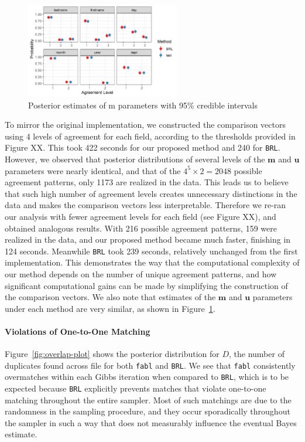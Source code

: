 \documentclass[12pt,letterpaper]{article}
\newcommand{\1}[1]{\mathbb{I}\!\left[#1\right]} %
\begin{document}
\begin{figure}[t]
	
	{\centering \includegraphics[width=0.6\textwidth]{../notes/figures/el_salvador/m_posterior_smallP} 
		
	}
	
	\caption{Posterior estimates of m parameters with 95\% credible intervals}\label{fig:m-and-u}
\end{figure}

To mirror the original implementation, we constructed the comparison
vectors using 4 levels of agreement for each field, according to the
thresholds provided in Figure XX. This took 422 seconds for our proposed
method and 240 for \texttt{BRL}. However, we observed that posterior
distributions of several levels of the \(\mathbf{m}\) and \(\mathbf{u}\)
parameters were nearly identical, and that of the
\(4^5 \times 2 = 2048\) possible agreement patterns, only 1173 are
realized in the data. This leads us to believe that such high number of
agreement levels creates unnecessary distinctions in the data and makes
the comparison vectors less interpretable. Therefore we re-ran our
analysis with fewer agreement levels for each field (see Figure XX), and
obtained analogous results. With 216 possible agreement patterns, 159
were realized in the data, and our proposed method became much faster,
finishing in 124 seconds. Meanwhile \texttt{BRL} took 239 seconds,
relatively unchanged from the first implementation. This demonstrates
the way that the computational complexity of our method depends on the
number of unique agreement patterns, and how significant computational
gains can be made by simplifying the construction of the comparison
vectors. We also note that estimates of the \(\mathbf{m}\) and
\(\mathbf{u}\) parameters under each method are very similar, as shown in
Figure~\ref{fig:m-and-u}.

\paragraph{Violations of One-to-One Matching} Figure~\ref{fig:overlap-plot} shows the posterior distribution for \(D\), the number of
duplicates found across file for both \texttt{fabl} and \texttt{BRL}. We
see that \texttt{fabl} consistently overmatches within each Gibbs
iteration when compared to \texttt{BRL}, which is to be expected because
\texttt{BRL} explicitly prevents matches that violate one-to-one
matching throughout the entire sampler. Most of such matchings are due
to the randomness in the sampling procedure, and they occur sporadically
throughout the sampler in such a way that does not measurably influence
the eventual Bayes estimate.
\end{document}
